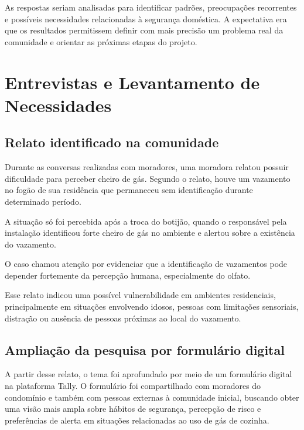 \documentclass[11pt,a4paper]{article}
\numberwithin{equation}{section}
\begin{document}
As respostas seriam analisadas para identificar padrões, preocupações recorrentes e possíveis
necessidades relacionadas à segurança doméstica. A expectativa era que os resultados permitissem
definir com mais precisão um problema real da comunidade e orientar as próximas etapas do projeto.

\section{Entrevistas e Levantamento de Necessidades}
\label{cap:entrevistas}

\subsection{Relato identificado na comunidade}

Durante as conversas realizadas com moradores, uma moradora relatou possuir dificuldade para perceber
cheiro de gás. Segundo o relato, houve um vazamento no fogão de sua residência que permaneceu sem
identificação durante determinado período.

A situação só foi percebida após a troca do botijão, quando o responsável pela instalação identificou
forte cheiro de gás no ambiente e alertou sobre a existência do vazamento.

O caso chamou atenção por evidenciar que a identificação de vazamentos pode depender fortemente da
percepção humana, especialmente do olfato.

Esse relato indicou uma possível vulnerabilidade em ambientes residenciais, principalmente em
situações envolvendo idosos, pessoas com limitações sensoriais, distração ou ausência de pessoas
próximas ao local do vazamento.

\subsection{Ampliação da pesquisa por formulário digital}

A partir desse relato, o tema foi aprofundado por meio de um formulário digital na plataforma Tally.
O formulário foi compartilhado com moradores do condomínio e também com pessoas externas à comunidade
inicial, buscando obter uma visão mais ampla sobre hábitos de segurança, percepção de risco e
preferências de alerta em situações relacionadas ao uso de gás de cozinha.
\end{document}

